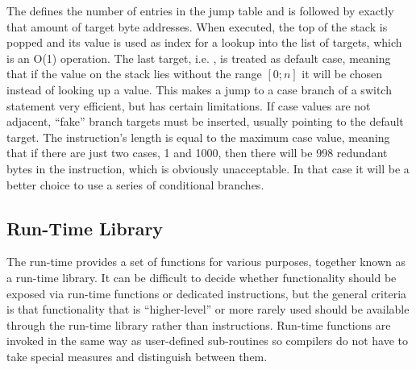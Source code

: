 
The  defines the number of entries in the jump table and is
followed by exactly that amount of target byte addresses. When executed, the top
of the stack is popped and its value is used as index for a lookup into the list
of targets, which is an O(1) operation. The last target, i.e. ,
is treated as default case, meaning that if the value on the stack lies without
the range $[0;n]$ it will be chosen instead of looking up a value. This makes a
jump to a case branch of a switch statement very efficient, but has certain
limitations. If case values are not adjacent, ``fake'' branch targets must be
inserted, usually pointing to the default target. The instruction's length is
equal to the maximum case value, meaning that if there are just two cases, 1 and
1000, then there will be 998 redundant bytes in the instruction, which is
obviously unacceptable. In that case it will be a better choice to use a series
of conditional branches.

\subsection{Run-Time Library}

The \thename{} run-time provides a set of functions for various purposes,
together known as a run-time library. It can be difficult to decide whether
functionality should be exposed via run-time functions or dedicated
instructions, but the general criteria is that functionality that is
``higher-level'' or more rarely used should be available through the run-time
library rather than instructions. Run-time functions are invoked in the same way
as user-defined sub-routines so compilers do not have to take special measures
and distinguish between them.


